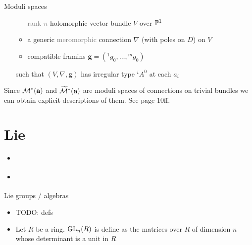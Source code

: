 \begin{frame}{Moduli spaces}
\begin{defn}[2.6]
\begin{itemize}
\begin{itemize}
            \textcolor{gray}{rank $n$} holomorphic vector bundle $V$ over $\P^1$
          \item a generic \textcolor{gray}{meromorphic} connection $\nabla$
            (with poles on $D$) on $V$
          \item compatible framins $\textbf{g}=({}^1g_0,\dots,{}^mg_0)$
        \end{itemize}
        such that $(V,\nabla,\textbf{g})$ has irregular type ${}^iA^0$ at each
        $a_i$
    \end{itemize}
  \end{defn}
  Since $\cM^*(\textbf{a})$ and $\widetilde\cM^*(\textbf{a})$ are moduli spaces
  of connections on trivial bundles we can obtain explicit descriptions of
  them. See \cite{sabbah_cimpa90} page 10ff.
\end{frame}

\section{Lie}%
\begin{frame}[t]
  {\Huge\insertsection{}}
  \begin{itemize}
    \item \cite{boalch}
    \item \cite{thboalch}
  \end{itemize}
\end{frame}

\begin{frame}{Lie groups / algebras}
  \begin{itemize}
    \item TODO: defs
    \item Let $R$ be a ring. $\GL_n(R)$ is define as the matrices
      over $R$ of dimension $n$ whose determinant is a unit in $R$
  \end{itemize}
\end{frame}

